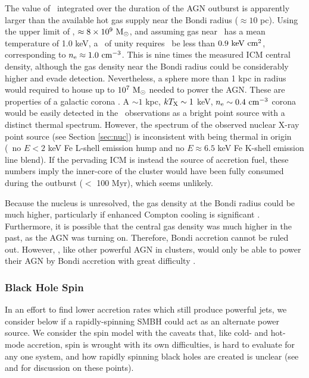 \documentclass[apjpt4]{aastex}
\begin{document}
The value of \dmb\ integrated over the duration of the AGN outburst is
apparently larger than the available hot gas supply near the Bondi
radius ($\approx 10$ pc). Using the upper limit of \mbh, $\approx 8
\times 10^9 ~\rm{M_{\odot}}$, and assuming gas near \rbon\ has a mean
temperature of 1.0 keV, a \dmb\ of unity requires \kbon\ be less than
$0.9 ~\rm{\mbox{\ensuremath{\rm{keV}}}~\ensuremath{\rm{\mbox{\ensuremath{\rm{cm}}}^2}}}$, corresponding to $n_{\rm{e}} \approx 1.0 ~\rm{\mbox{\ensuremath{\rm{cm}}}^{-3}}$. This is nine
times the measured ICM central density, although the gas density near
the Bondi radius could be considerably higher and evade detection.
Nevertheless, a sphere more than 1 kpc in radius would required to
house up to $10^7 ~\rm{M_{\odot}}$ needed to power the AGN. These are
properties of a galactic corona \citep{coronae}. A $\sim 1$ kpc, $kT_{\rm{X}}
\sim 1$ keV, $n_{\rm{e}} \sim 0.4 ~\rm{\mbox{\ensuremath{\rm{cm}}}^{-3}}$ corona would be easily detected
in the \cxo\ observations as a bright point source with a distinct
thermal spectrum. However, the spectrum of the observed nuclear X-ray
point source (see Section \ref{sec:nuc}) is inconsistent with being
thermal in origin (\ie\ no $E < 2$ keV Fe L-shell emission hump and no
$E \approx 6.5$ keV Fe K-shell emission line blend). If the pervading
ICM is instead the source of accretion fuel, these numbers imply the
inner-core of the cluster would have been fully consumed during the
outburst ($<$ 100 Myr), which seems unlikely.

Because the nucleus is unresolved, the gas density at the Bondi radius
could be much higher, particularly if enhanced Compton cooling is
significant \citep[\eg][]{2010MNRAS.402.1561R}. Furthermore, it is
possible that the central gas density was much higher in the past, as
the AGN was turning on. Therefore, Bondi accretion cannot be ruled
out. However, \rbs, like other powerful AGN in clusters, would only be
able to power their AGN by Bondi accretion with great difficulty
\citep{rafferty06, minaspin}.

\subsubsection{Black Hole Spin}

In an effort to find lower accretion rates which still produce
powerful jets, we consider below if a rapidly-spinning SMBH could act
as an alternate power source. We consider the spin model with the
caveats that, like cold- and hot-mode accretion, spin is wrought with
its own difficulties, is hard to evaluate for any one system, and how
rapidly spinning black holes are created is unclear (see
\citealt{msspin} and \citealt{minaspin} for discussion on these
points).
\end{document}
